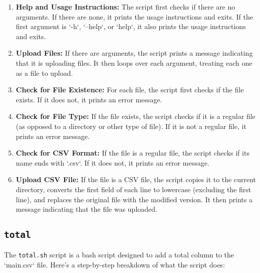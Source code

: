 \documentclass{article}
\begin{document}
\begin{enumerate}
    \item \textbf{Help and Usage Instructions:} The script first checks if there are no arguments. If there are none, it prints the usage instructions and exits. If the first argument is `-h`, `--help`, or `help`, it also prints the usage instructions and exits.
    
    \item \textbf{Upload Files:} If there are arguments, the script prints a message indicating that it is uploading files. It then loops over each argument, treating each one as a file to upload.
    
    \item \textbf{Check for File Existence:} For each file, the script first checks if the file exists. If it does not, it prints an error message.
    
    \item \textbf{Check for File Type:} If the file exists, the script checks if it is a regular file (as opposed to a directory or other type of file). If it is not a regular file, it prints an error message.
    
    \item \textbf{Check for CSV Format:} If the file is a regular file, the script checks if its name ends with `.csv`. If it does not, it prints an error message.
    
    \item \textbf{Upload CSV File:} If the file is a CSV file, the script copies it to the current directory, converts the first field of each line to lowercase (excluding the first line), and replaces the original file with the modified version. It then prints a message indicating that the file was uploaded.
\end{enumerate}

\subsection{\texttt{total}}
The \texttt{total.sh} script is a bash script designed to add a total column to the `main.csv` file. Here's a step-by-step breakdown of what the script does:
\end{document}
